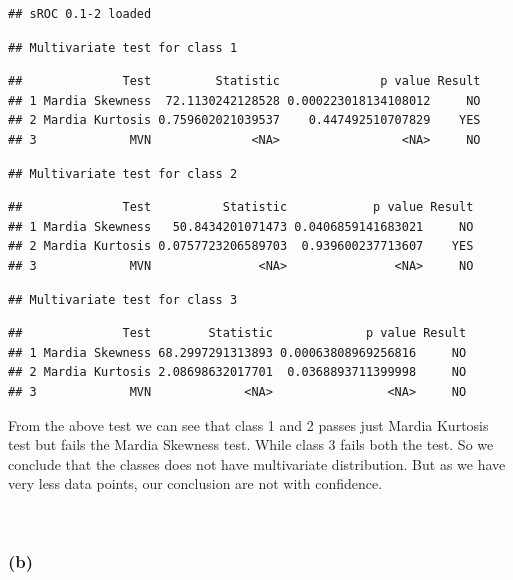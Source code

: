 \documentclass[]{article}
\begin{document}
\begin{verbatim}
## sROC 0.1-2 loaded
\end{verbatim}

\begin{verbatim}
## Multivariate test for class 1
\end{verbatim}

\begin{verbatim}
##              Test         Statistic              p value Result
## 1 Mardia Skewness  72.1130242128528 0.000223018134108012     NO
## 2 Mardia Kurtosis 0.759602021039537    0.447492510707829    YES
## 3             MVN              <NA>                 <NA>     NO
\end{verbatim}

\begin{verbatim}
## Multivariate test for class 2
\end{verbatim}

\begin{verbatim}
##              Test          Statistic            p value Result
## 1 Mardia Skewness   50.8434201071473 0.0406859141683021     NO
## 2 Mardia Kurtosis 0.0757723206589703  0.939600237713607    YES
## 3             MVN               <NA>               <NA>     NO
\end{verbatim}

\begin{verbatim}
## Multivariate test for class 3
\end{verbatim}

\begin{verbatim}
##              Test        Statistic             p value Result
## 1 Mardia Skewness 68.2997291313893 0.00063808969256816     NO
## 2 Mardia Kurtosis 2.08698632017701  0.0368893711399998     NO
## 3             MVN             <NA>                <NA>     NO
\end{verbatim}

From the above test we can see that class 1 and 2 passes just Mardia
Kurtosis test but fails the Mardia Skewness test. While class 3 fails
both the test. So we conclude that the classes does not have
multivariate distribution. But as we have very less data points, our
conclusion are not with confidence.

~

\subsubsection{(b)}\label{b}
\end{document}
